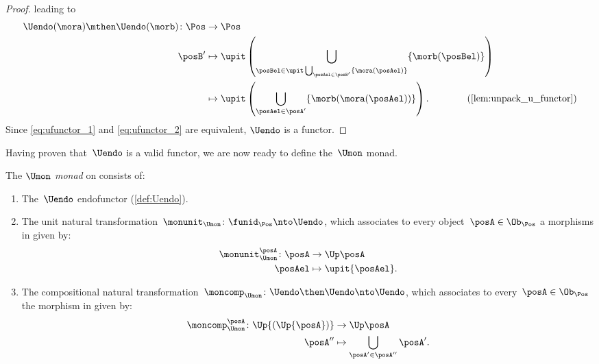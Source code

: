 \begin{proof}
    leading to
    \begin{equation}
        \label{eq:ufunctor_2}
        \begin{aligned}
            \Uendo(\mora)\mthen \Uendo(\morb)\colon \Pos & \to \Pos                                                                                                                       \\
            \posB'                                       & \mapsto \upit\left( \bigcup_{\posBel\in \upit \bigcup_{\posAel\in \posB'}\{\mora(\posAel)\}}\{\morb(\posBel)\}\right)          \\
                                                         & \mapsto \upit \left(\bigcup_{\posAel\in \posA'} \{ \morb(\mora(\posAel))\}\right). \qquad \qquad (\cref{lem:unpack_u_functor})
        \end{aligned}
    \end{equation}
    Since \cref{eq:ufunctor_1} and \cref{eq:ufunctor_2} are equivalent, $\Uendo$ is a functor.
\end{proof}
Having proven that~$\Uendo$ is a valid functor, we are now ready to define the~$\Umon$ monad.
\begin{definition}
    \label{def:Umon}
    The \emph{$\Umon$ monad} on \Pos consists of:
    \begin{enumerate}
        \item The~$\Uendo$ endofunctor (\cref{def:Uendo}).
        \item The unit natural transformation~$\monunit_{\Umon} \colon \funid_{\Pos}\nto \Uendo$, which associates to every object~$\posA \in \Ob_\Pos$ a morphisms in \Pos given by:
              \begin{equation}
                  \begin{aligned}
                      \monunit_{\Umon}^\posA\colon \posA & \to \Up \posA              \\
                      \posAel                            & \mapsto \upit \{\posAel\}.
                  \end{aligned}
              \end{equation}
        \item The compositional natural transformation~$\moncomp_{\Umon}\colon \Uendo\then \Uendo\nto \Uendo$, which associates to every~$\posA\in \Ob_\Pos$ the morphism in \Pos given by:
              \begin{equation}
                  \begin{aligned}
                      \moncomp_{\Umon}^\posA\colon \Up{(\Up{\posA})} & \to \Up \posA                              \\
                      \posA''                                        & \mapsto \bigcup_{\posA'\in \posA''}\posA'.
                  \end{aligned}
              \end{equation}
    \end{enumerate}
\end{definition}

